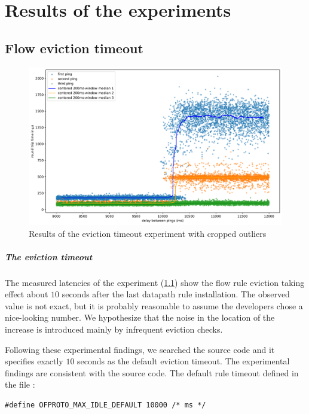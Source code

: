 \chapter{Results of the experiments}
\label{chap:exp}

\section{Flow eviction timeout}
\label{res:eviction-timeout}

\begin{figure}
    \centering
    \includegraphics[width=.9\linewidth]{img/randomized_eviction_timeout.pdf}
    \caption{Results of the eviction timeout experiment with cropped outliers}
    \label{fig:plot-eviction-timeout}
\end{figure}

\paragraph{The eviction timeout} The measured latencies of the experiment (\cref{fig:plot-eviction-timeout}) show the flow rule eviction taking effect about $10$ seconds after the last datapath rule installation. The observed value is not exact, but it is probably reasonable to assume the developers chose a nice-looking number. We hypothesize that the noise in the location of the increase is introduced mainly by infrequent eviction checks.

Following these experimental findings, we searched the source code and it specifies exactly $10$ seconds as the default eviction timeout. The experimental findings are consistent with the source code. The default rule timeout defined in the file :
\begin{verbatim}
#define OFPROTO_MAX_IDLE_DEFAULT 10000 /* ms */
\end{verbatim}

